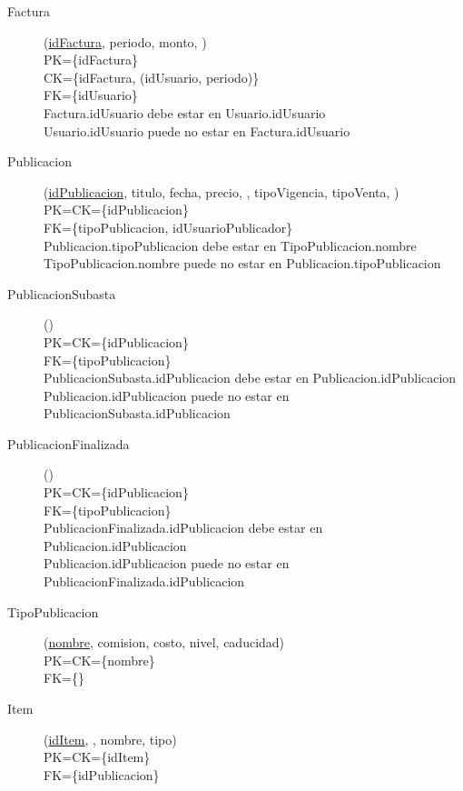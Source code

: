 \begin{description}
 \item[Factura](\underline{idFactura}, periodo, monto, )\\
PK=\{idFactura\}\\
CK=\{idFactura, (idUsuario, periodo)\}\\
FK=\{idUsuario\}\\
Factura.idUsuario debe estar en Usuario.idUsuario\\
Usuario.idUsuario puede no estar en Factura.idUsuario

 \item[Publicacion](\underline{idPublicacion}, titulo, fecha, precio, , tipoVigencia, tipoVenta, )\\
PK=CK=\{idPublicacion\}\\
FK=\{tipoPublicacion, idUsuarioPublicador\}\\
Publicacion.tipoPublicacion debe estar en TipoPublicacion.nombre\\
TipoPublicacion.nombre puede no estar en Publicacion.tipoPublicacion

 \item[PublicacionSubasta](\underline{})\\
PK=CK=\{idPublicacion\}\\
FK=\{tipoPublicacion\}\\
PublicacionSubasta.idPublicacion debe estar en Publicacion.idPublicacion\\
Publicacion.idPublicacion puede no estar en PublicacionSubasta.idPublicacion

 \item[PublicacionFinalizada](\underline{})\\
PK=CK=\{idPublicacion\}\\
FK=\{tipoPublicacion\}\\
PublicacionFinalizada.idPublicacion debe estar en Publicacion.idPublicacion\\
Publicacion.idPublicacion puede no estar en PublicacionFinalizada.idPublicacion

 \item[TipoPublicacion](\underline{nombre}, comision, costo, nivel, caducidad)\\
PK=CK=\{nombre\}\\
FK=\{\}

 \item[Item](\underline{idItem}, , nombre, tipo)\\
PK=CK=\{idItem\}\\
FK=\{idPublicacion\}


\end{description}
